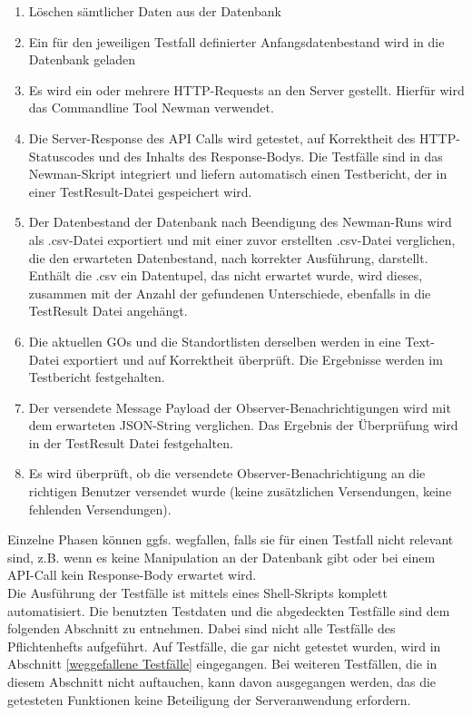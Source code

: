 \documentclass[11pt,a4paper]{scrartcl}
\begin{document}
\begin{enumerate}
	\item Löschen sämtlicher Daten aus der Datenbank
	\item Ein für den jeweiligen Testfall definierter Anfangsdatenbestand wird in die Datenbank geladen
	\item Es wird ein oder mehrere HTTP-Requests an den Server gestellt. Hierfür wird das Commandline Tool Newman verwendet.
	\item Die Server-Response des API Calls wird getestet, auf Korrektheit des HTTP-Statuscodes und des Inhalts des Response-Bodys. Die Testfälle sind in das Newman-Skript integriert und liefern automatisch einen Testbericht, der in einer TestResult-Datei gespeichert wird.
	\item Der Datenbestand der Datenbank nach Beendigung des Newman-Runs wird als .csv-Datei exportiert und mit einer zuvor erstellten .csv-Datei verglichen, die den erwarteten Datenbestand, nach korrekter Ausführung, darstellt. Enthält die .csv ein Datentupel, das nicht erwartet wurde,  wird dieses, zusammen mit der Anzahl der gefundenen Unterschiede, ebenfalls in die TestResult Datei angehängt.
	\item Die aktuellen GOs und die Standortlisten derselben werden in eine Text-Datei exportiert und auf Korrektheit überprüft. Die Ergebnisse werden im Testbericht festgehalten.
	\item Der versendete Message Payload der Observer-Benachrichtigungen wird mit dem erwarteten JSON-String verglichen. Das Ergebnis der Überprüfung wird in der TestResult Datei festgehalten.
	\item Es wird überprüft, ob die versendete Observer-Benachrichtigung an die richtigen Benutzer versendet wurde (keine zusätzlichen Versendungen, keine fehlenden Versendungen).
\end{enumerate}
Einzelne Phasen können ggfs. wegfallen, falls sie für einen Testfall nicht relevant sind, z.B. wenn es keine Manipulation an der Datenbank gibt oder bei einem API-Call kein Response-Body erwartet wird.\\

Die Ausführung der Testfälle ist mittels eines Shell-Skripts komplett automatisiert. Die benutzten Testdaten und die abgedeckten Testfälle sind dem folgenden Abschnitt zu entnehmen. Dabei sind nicht alle Testfälle des Pflichtenhefts aufgeführt. Auf Testfälle, die gar nicht getestet wurden, wird in Abschnitt \ref{weggefallene Testfälle} eingegangen. Bei weiteren Testfällen, die in diesem Abschnitt nicht auftauchen, kann davon ausgegangen werden, das die getesteten Funktionen keine Beteiligung der Serveranwendung erfordern.\\
\end{document}
